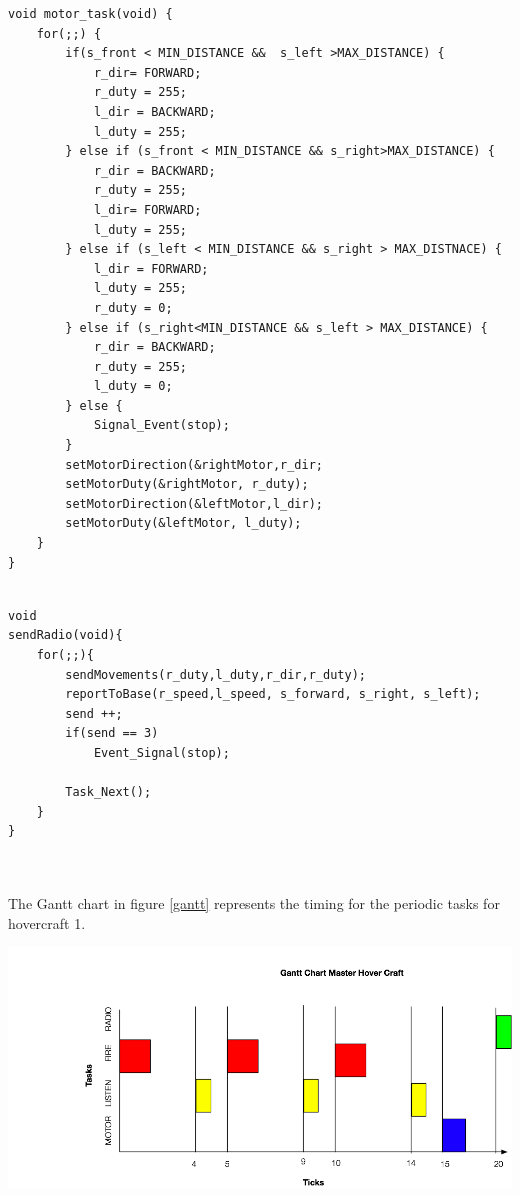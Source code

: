 \begin{lstlisting}[label=lst:h1motor,float=th,
                   caption={\texttt{MOTOR} Task}]
void motor_task(void) {
	for(;;) {
    	if(s_front < MIN_DISTANCE &&  s_left >MAX_DISTANCE) {
            r_dir= FORWARD;
            r_duty = 255;
            l_dir = BACKWARD;
            l_duty = 255;
   		} else if (s_front < MIN_DISTANCE && s_right>MAX_DISTANCE) {
            r_dir = BACKWARD;
            r_duty = 255;
            l_dir= FORWARD;
            l_duty = 255;					
    	} else if (s_left < MIN_DISTANCE && s_right > MAX_DISTNACE) {
            l_dir = FORWARD;
            l_duty = 255;
            r_duty = 0;
   	 	} else if (s_right<MIN_DISTANCE && s_left > MAX_DISTANCE) {
            r_dir = BACKWARD;
            r_duty = 255;
            l_duty = 0;
    	} else {
            Signal_Event(stop);
    	}
        setMotorDirection(&rightMotor,r_dir;
        setMotorDuty(&rightMotor, r_duty);
        setMotorDirection(&leftMotor,l_dir);
        setMotorDuty(&leftMotor, l_duty);
	}
}
\end{lstlisting}

\begin{lstlisting}[label=lst:h1radio, float=th, caption={\texttt{RADIO} Task}]

void
sendRadio(void){
    for(;;){
        sendMovements(r_duty,l_duty,r_dir,r_duty);
        reportToBase(r_speed,l_speed, s_forward, s_right, s_left);
        send ++;
        if(send == 3)
            Event_Signal(stop);
        
        Task_Next();
    }
}



\end{lstlisting}

The Gantt chart in figure \ref{gantt} represents the timing for the periodic
tasks for hovercraft 1.

        \begin{center}
        \includegraphics[width = 5.5in]{imageSources/Gantt.png}
        \label{gantt}
        \end{center}

